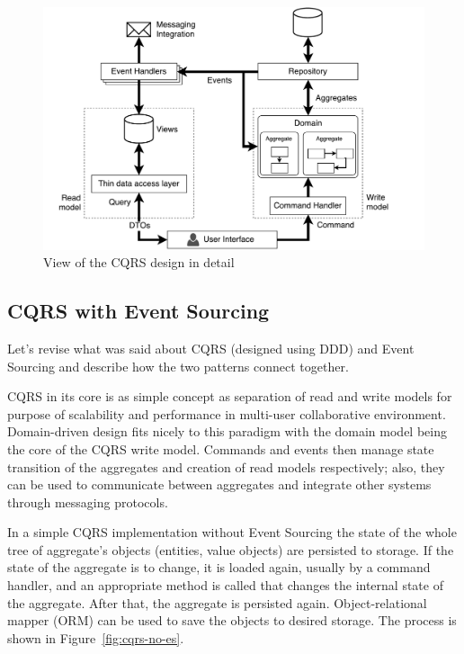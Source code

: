 \documentclass{book}
\begin{document}
\begin{figure}[h!]
\begin{center}
\includegraphics[width=0.84\columnwidth]{figures/cqrs-detail/cqrs-detail}
\caption{View of the CQRS design in detail%
}
\end{center}
\end{figure}

\subsection{CQRS with Event Sourcing}\label{cqrs-with-event-sourcing}

Let's revise what was said about CQRS (designed using DDD) and Event
Sourcing and describe how the two patterns connect together.

CQRS in its core is as simple concept as separation of read and write
models for purpose of scalability and performance in multi-user
collaborative environment. Domain-driven design fits nicely to this
paradigm with the domain model being the core of the CQRS write model.
Commands and events then manage state transition of the aggregates and
creation of read models respectively; also, they can be used to
communicate between aggregates and integrate other systems through
messaging protocols.

In a simple CQRS implementation without Event Sourcing the state of the
whole tree of aggregate's objects (entities, value objects) are
persisted to storage. If the state of the aggregate is to change, it is
loaded again, usually by a command handler, and an appropriate method is
called that changes the internal state of the aggregate. After that, the
aggregate is persisted again. Object-relational mapper (ORM) can be used
to save the objects to desired storage. The process is shown in Figure~\ref{fig:cqrs-no-es}.
\end{document}
